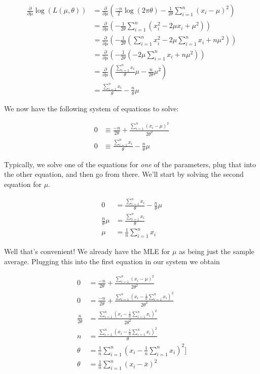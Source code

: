 \documentclass[
  letterpaper,
  DIV=11,
  numbers=noendperiod]{scrreprt}
\begin{document}
\begin{align*}
    \frac{\partial}{\partial \mu}\log(L(\mu, \theta)) & = \frac{\partial}{\partial \mu} \left(\frac{-n}{2} \log(2\pi \theta) - \frac{1}{2\theta} \sum_{i = 1}^n (x_i - \mu)^2 \right)\\
    & = \frac{\partial}{\partial \mu} \left( -\frac{1}{2\theta} \sum_{i = 1}^n (x_i^2 - 2 \mu x_i + \mu^2)\right) \\
    & = \frac{\partial}{\partial \mu} \left( -\frac{1}{2\theta} ( \sum_{i = 1}^n x_i^2 - 2 \mu \sum_{i = 1}^n x_i + n\mu^2 )\right) \\
    & = \frac{\partial}{\partial \mu} \left( -\frac{1}{2\theta} (- 2 \mu \sum_{i = 1}^n x_i + n\mu^2 ) \right) \\
    & = \frac{\partial}{\partial \mu} \left(   \frac{\sum_{i = 1}^n x_i}{\theta} \mu - \frac{n}{2\theta}\mu^2  \right) \\
    & = \frac{\sum_{i = 1}^n x_i}{\theta} - \frac{n}{\theta} \mu
\end{align*}

We now have the following system of equations to solve:

\begin{align*}
    0 & \equiv \frac{-n}{2 \theta} + \frac{\sum_{i = 1}^n (x_i - \mu)^2 }{2 \theta^2} \\
    0 & \equiv \frac{\sum_{i = 1}^n x_i}{\theta} - \frac{n}{\theta} \mu
\end{align*}

Typically, we solve one of the equations for \emph{one} of the
parameters, plug that into the other equation, and then go from there.
We'll start by solving the second equation for \(\mu\).

\begin{align*}
    0 & = \frac{\sum_{i = 1}^n x_i}{\theta} - \frac{n}{\theta} \mu \\
    \frac{n}{\theta} \mu & = \frac{\sum_{i = 1}^n x_i}{\theta} \\
    \mu & = \frac{1}{n} \sum_{i = 1}^n x_i
\end{align*}

Well that's convenient! We already have the MLE for \(\mu\) as being
just the sample average. Plugging this into the first equation in our
system we obtain

\begin{align*}
    0 & = \frac{-n}{2 \theta} + \frac{\sum_{i = 1}^n (x_i - \mu)^2 }{2 \theta^2} \\
    0 & = \frac{-n}{2 \theta} + \frac{\sum_{i = 1}^n (x_i - \frac{1}{n} \sum_{i = 1}^n x_i )^2 }{2 \theta^2} \\
    \frac{n}{2 \theta} & = \frac{\sum_{i = 1}^n (x_i - \frac{1}{n} \sum_{i = 1}^n x_i )^2 }{2 \theta^2} \\
    n & = \frac{\sum_{i = 1}^n (x_i - \frac{1}{n} \sum_{i = 1}^n x_i )^2 }{\theta} \\
    \theta & = \frac{1}{n} \sum_{i = 1}^n (x_i - \frac{1}{n} \sum_{i = 1}^n x_i )^2] \\
    \theta & = \frac{1}{n} \sum_{i = 1}^n (x_i - \bar{x} )^2
\end{align*}
\end{document}
